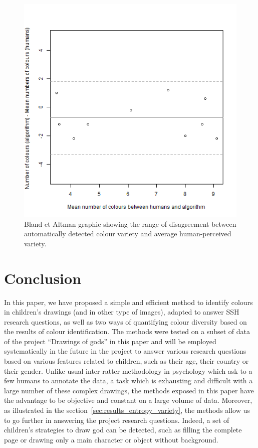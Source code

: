 \documentclass[11pt,a4paper]{article}
\begin{document}
\begin{figure}[h!]
	\centering
	\includegraphics[width=\linewidth]{figures/comp_nb_colours_agreement.png}
	\caption{Bland et Altman graphic showing the range of disagreement between automatically detected colour variety and average human-perceived variety.}
	\label{fig:blandandaltman}
\end{figure}

\section{Conclusion}
\label{sec:conclusion}
In this paper, we have proposed a simple and efficient method to identify colours in children's drawings (and in other type of images), adapted to answer SSH research questions, as well as two ways of quantifying colour diversity based on the results of colour identification.
The methods were tested on a subset of data of the project ``Drawings of gods'' in this paper and will be employed systematically in the future in the project to answer various research questions based on various features related to children, such as their age, their country or their gender. Unlike usual inter-ratter methodology in psychology which ask to a few humans to annotate the data, a task which is exhausting and difficult with a large number of these complex drawings, the methods exposed in this paper have the advantage to be objective and constant on a large volume of data. 
Moreover, as illustrated in the section~\ref{sec:results_entropy_variety}, the methods allow us to go further in answering the project research questions. Indeed, a set of children's strategies to draw god can be detected, such as filling the complete page or drawing only a main character or object without background.
\end{document}
